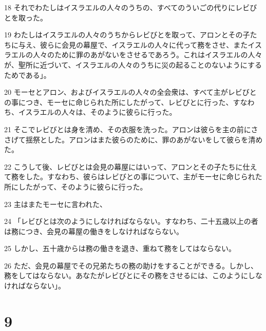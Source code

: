\par 18 それでわたしはイスラエルの人々のうちの、すべてのういごの代りにレビびとを取った。
\par 19 わたしはイスラエルの人々のうちからレビびとを取って、アロンとその子たちに与え、彼らに会見の幕屋で、イスラエルの人々に代って務をさせ、またイスラエルの人々のために罪のあがないをさせるであろう。これはイスラエルの人々が、聖所に近づいて、イスラエルの人々のうちに災の起ることのないようにするためである」。
\par 20 モーセとアロン、およびイスラエルの人々の全会衆は、すべて主がレビびとの事につき、モーセに命じられた所にしたがって、レビびとに行った、すなわち、イスラエルの人々は、そのように彼らに行った。
\par 21 そこでレビびとは身を清め、その衣服を洗った。アロンは彼らを主の前にささげて揺祭とした。アロンはまた彼らのために、罪のあがないをして彼らを清めた。
\par 22 こうして後、レビびとは会見の幕屋にはいって、アロンとその子たちに仕えて務をした。すなわち、彼らはレビびとの事について、主がモーセに命じられた所にしたがって、そのように彼らに行った。
\par 23 主はまたモーセに言われた、
\par 24 「レビびとは次のようにしなければならない。すなわち、二十五歳以上の者は務につき、会見の幕屋の働きをしなければならない。
\par 25 しかし、五十歳からは務の働きを退き、重ねて務をしてはならない。
\par 26 ただ、会見の幕屋でその兄弟たちの務の助けをすることができる。しかし、務をしてはならない。あなたがレビびとにその務をさせるには、このようにしなければならない」。

\chapter{9}

